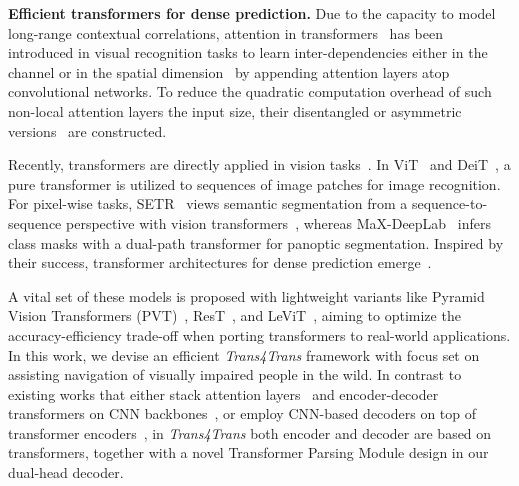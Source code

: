 \documentclass[10pt,twocolumn,letterpaper]{article}
\begin{document}
\noindent\textbf{Efficient transformers for dense prediction.}
Due to the capacity to model long-range contextual correlations, attention in transformers~\cite{vaswani2017attention} has been introduced in visual recognition tasks to learn inter-dependencies either in the channel or in the spatial dimension~\cite{danet,nonlocal,ocnet} by appending attention layers atop convolutional networks. To reduce the quadratic computation overhead of such non-local attention layers \wrt the input size, their disentangled or asymmetric versions~\cite{ccnet,yang2021capturing,yin2020disentangled,zhu2019asymmetric} are constructed.

Recently, transformers are directly applied in vision tasks~\cite{detr,vit,deformable_detr}. In ViT~\cite{vit} and DeiT~\cite{deit}, a pure transformer is utilized to sequences of image patches for image recognition.
For pixel-wise tasks, SETR~\cite{setr} views semantic segmentation from a sequence-to-sequence perspective with vision transformers~\cite{vit}, whereas MaX-DeepLab~\cite{maxdeeplab} infers class masks with a dual-path transformer for panoptic segmentation. Inspired by their success, transformer architectures for dense prediction emerge~\cite{twins,swin,segmenter,fully_transformer_networks,p2t,segformer}.

A vital set of these models is proposed with lightweight variants like Pyramid Vision Transformers (PVT)~\cite{pvt}, ResT~\cite{rest}, and LeViT~\cite{levit}, aiming to optimize the accuracy-efficiency trade-off when porting transformers to real-world applications. In this work, we devise an efficient \emph{Trans4Trans} framework with focus set on assisting navigation of visually impaired people in the wild. In contrast to existing works that either stack attention layers~\cite{danet,yang2021capturing} and encoder-decoder transformers on CNN backbones~\cite{xie2021segmenting}, or employ CNN-based decoders on top of transformer encoders~\cite{pvt,setr}, in \emph{Trans4Trans} both encoder and decoder are based on transformers, together with a novel Transformer Parsing Module design in our dual-head decoder.





\end{document}

